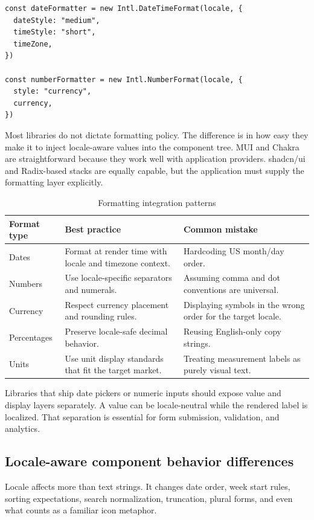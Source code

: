 \begin{verbatim}
const dateFormatter = new Intl.DateTimeFormat(locale, {
  dateStyle: "medium",
  timeStyle: "short",
  timeZone,
})

const numberFormatter = new Intl.NumberFormat(locale, {
  style: "currency",
  currency,
})
\end{verbatim}

Most libraries do not dictate formatting policy. The difference is in how easy they make it to inject locale-aware values into the component tree. MUI and Chakra are straightforward because they work well with application providers. shadcn/ui and Radix-based stacks are equally capable, but the application must supply the formatting layer explicitly.

\begin{table}[htbp]
  \centering
  \caption{Formatting integration patterns}
  \begin{tabularx}{\textwidth}{@{}p{}p{}Y@{}}
    \toprule
    \textbf{Format type} & \textbf{Best practice} & \textbf{Common mistake} \\
    \midrule
    Dates & Format at render time with locale and timezone context. & Hardcoding US month/day order. \\
    Numbers & Use locale-specific separators and numerals. & Assuming comma and dot conventions are universal. \\
    Currency & Respect currency placement and rounding rules. & Displaying symbols in the wrong order for the target locale. \\
    Percentages & Preserve locale-safe decimal behavior. & Reusing English-only copy strings. \\
    Units & Use unit display standards that fit the target market. & Treating measurement labels as purely visual text. \\
    \bottomrule
  \end{tabularx}
\end{table}

Libraries that ship date pickers or numeric inputs should expose value and display layers separately. A value can be locale-neutral while the rendered label is localized. That separation is essential for form submission, validation, and analytics.

\subsection{Locale-aware component behavior differences}
Locale affects more than text strings. It changes date order, week start rules, sorting expectations, search normalization, truncation, plural forms, and even what counts as a familiar icon metaphor.

